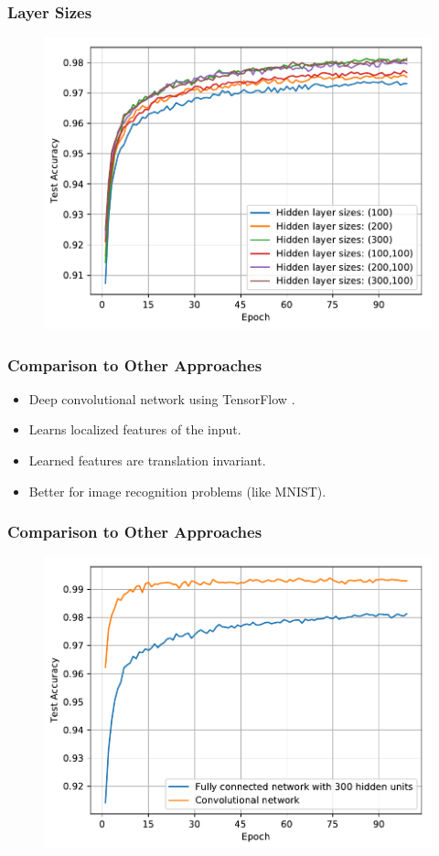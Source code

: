 \documentclass[pdf]{beamer}
\begin{document}
\begin{frame}
\frametitle{Layer Sizes}
\begin{figure}[!htb]
  \includegraphics[height=0.8\textheight]{plots/network_size_zoom.pdf}
\end{figure}
\end{frame}

\begin{frame}
\frametitle{Comparison to Other Approaches}
\begin{itemize}
  \item Deep convolutional network using TensorFlow \cite{tensorflow}.
  \item Learns localized features of the input.
  \item Learned features are translation invariant.
  \item Better for image recognition problems (like MNIST).
\end{itemize}
\end{frame}

\begin{frame}
\frametitle{Comparison to Other Approaches}
\begin{figure}[!htb]
  \includegraphics[height=0.8\textheight]{plots/network_comparison.pdf}
\end{figure}
\end{frame}
\end{document}
